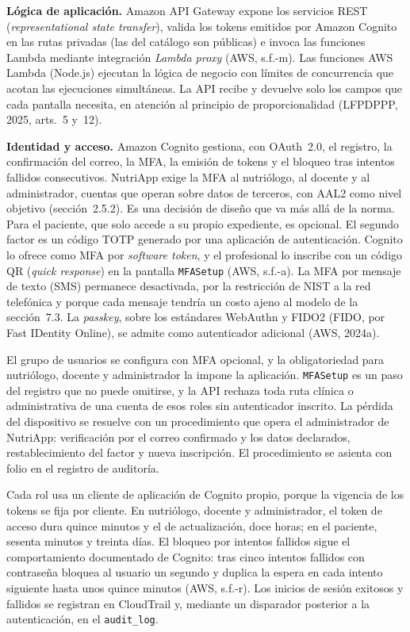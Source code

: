 \documentclass[12pt, a4paper]{article}
\begin{document}
\textbf{Lógica de aplicación.} Amazon API Gateway expone los servicios
REST (\textit{representational state transfer}), valida los tokens emitidos por Amazon Cognito en las rutas
privadas (las del catálogo son públicas) e invoca las funciones Lambda mediante integración \textit{Lambda proxy} (AWS,
s.f.-m).
Las funciones AWS Lambda (Node.js) ejecutan la lógica de negocio con
límites de concurrencia que acotan las ejecuciones simultáneas. La API
recibe y devuelve solo los campos que cada pantalla necesita, en
atención al principio de proporcionalidad (LFPDPPP, 2025, arts.~5 y~12).

\textbf{Identidad y acceso.} Amazon Cognito gestiona, con OAuth~2.0, el registro, la
confirmación del correo, la MFA, la emisión
de tokens y el bloqueo tras intentos fallidos consecutivos. NutriApp exige la MFA al nutriólogo, al docente y al administrador, cuentas que operan sobre datos de terceros, con AAL2 como
nivel objetivo (sección~2.5.2). Es una decisión de diseño que va más allá de la norma. Para el paciente, que solo accede a su propio expediente, es opcional. El segundo factor es un código TOTP
generado por una aplicación de
autenticación. Cognito lo ofrece como MFA por \textit{software token}, y
el profesional lo inscribe con un código QR (\textit{quick response}) en la pantalla
\texttt{MFASetup} (AWS, s.f.-a). La MFA por mensaje de texto (SMS) permanece desactivada, por la restricción de NIST a la red telefónica y
porque cada mensaje tendría un costo ajeno al modelo de la sección~7.3. La \textit{passkey}, sobre los estándares WebAuthn y FIDO2 (FIDO, por Fast IDentity Online), se admite como autenticador adicional (AWS, 2024a).

El grupo de usuarios se configura con MFA opcional, y la obligatoriedad
para nutriólogo, docente y administrador la impone la aplicación.
\texttt{MFASetup} es un paso del registro que no puede omitirse, y la
API rechaza toda ruta clínica o administrativa de una cuenta de esos
roles sin autenticador inscrito. La pérdida del dispositivo se resuelve
con un procedimiento que opera el administrador de NutriApp:
verificación por el correo confirmado y los datos declarados,
restablecimiento del factor y nueva inscripción. El procedimiento se
asienta con folio en el registro de auditoría.

Cada rol usa un cliente de aplicación de Cognito propio, porque la
vigencia de los tokens se fija por cliente. En nutriólogo, docente y
administrador, el token de acceso dura quince minutos y el de
actualización, doce horas; en el paciente, sesenta minutos y treinta
días. El bloqueo por intentos fallidos sigue el comportamiento
documentado de Cognito: tras cinco intentos fallidos con contraseña
bloquea al usuario un segundo y duplica la espera en cada intento
siguiente hasta unos quince minutos (AWS, s.f.-r). Los inicios de sesión
exitosos y fallidos se registran en CloudTrail y, mediante un disparador
posterior a la autenticación, en el \texttt{audit\_log}.
\end{document}
